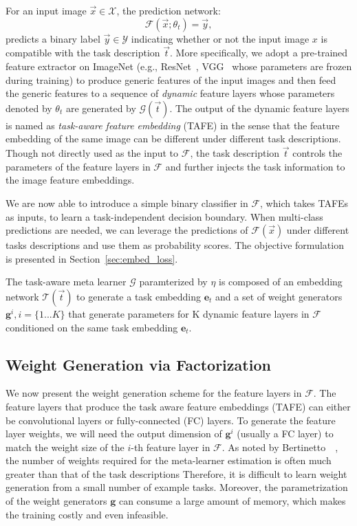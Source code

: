 \documentclass[10pt,twocolumn,letterpaper]{article}
\begin{document}
For an input image $\Vec{x}\in\mathcal{X}$, the prediction network:
\begin{equation}
\mathcal{F}(\Vec{x};\theta_t) = \Vec{y},    
\end{equation}
predicts a binary label $\Vec{y}\in\mathcal{Y}$ indicating whether or not the input image $x$ is compatible with 
the task description $\Vec{t}$. More specifically, we adopt a pre-trained feature extractor on ImageNet (e.g., ResNet~\cite{he2016deep}, VGG~\cite{simonyan2014very} whose parameters are frozen during training) to produce generic features of the input images and then feed the generic features to a sequence of \emph{dynamic}
feature layers whose parameters denoted by $\theta_t$ are generated by $\mathcal{G}(\Vec{t})$.  The output of the dynamic feature layers is named 
as \emph{task-aware feature embedding} (TAFE) in the sense that the feature embedding 
of the same image can be different under different task descriptions. Though not directly used as the input to $\mathcal{F}$,
the task description $\Vec{t}$ controls the parameters of the feature layers in $\mathcal{F}$ and further injects the task information to the
image feature embeddings. 

We are now able to introduce a simple binary classifier in $\mathcal{F}$, which takes TAFEs as inputs,  
to learn a task-independent decision boundary. When multi-class predictions are needed, we can leverage the predictions of $\mathcal{F}(\Vec{x})$ under different tasks descriptions and use them as probability scores. The objective formulation is presented in Section~\ref{sec:embed_loss}. 


The task-aware meta learner $\mathcal{G}$ paramterized by $\eta$ is composed of an embedding network 
$\mathcal{T}(\Vec{t})$ to generate a task embedding $\mathbf{e}_t$ and a set of
weight generators $\mathbf{g}^i, i=\{1...K\}$ that generate parameters for K dynamic feature
layers in $\mathcal{F}$ conditioned on the same task embedding $\mathbf{e}_t$.  

\subsection{Weight Generation via Factorization}
\label{sec:weight_factorization}
We now present the weight generation scheme for the feature layers in 
$\mathcal{F}$. The feature layers that produce the task aware feature embeddings (TAFE) can either be convolutional layers or fully-connected (FC) layers. To generate the feature layer weights,  we will need the output dimension of $\mathbf{g}^i$ (usually a FC layer) to match the weight size of the $i$-th feature layer in $\mathcal{F}$. As noted by Bertinetto~\etal~\cite{bertinetto2016learning}, the 
number of weights required for the meta-learner estimation is often much greater than that of the task descriptions Therefore, it is difficult to learn weight generation from a small number of example tasks. Moreover, the parametrization of the weight generators $\mathbf{g}$ can consume a large amount 
of memory, which makes the training costly and even infeasible. 
\end{document}

